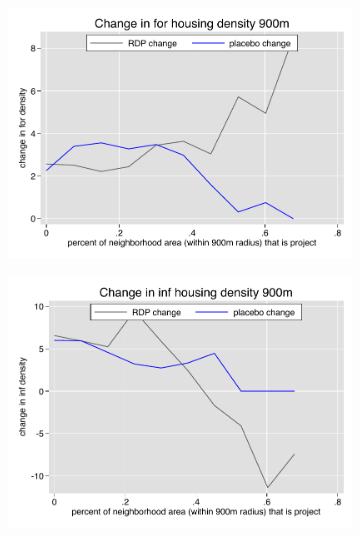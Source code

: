 \documentclass[12pt]{article}
\begin{document}
\begin{figure}
        \begin{subfigure}[b]{0.495\textwidth}
            \centering
            \includegraphics[width=\textwidth,trim={0.3cm .3cm 0.1cm 0cm}, clip=true]{figures/change_for_900_local.pdf}
        \end{subfigure}
        \hfill
        \begin{subfigure}[b]{0.495\textwidth}  
            \centering 
            \includegraphics[width=\textwidth,trim={0.3cm .3cm 0.1cm 0cm}, clip=true]{figures/change_inf_900_local.pdf}
        \end{subfigure}
        \vspace{-6mm}
  \end{figure} 
\end{document}
